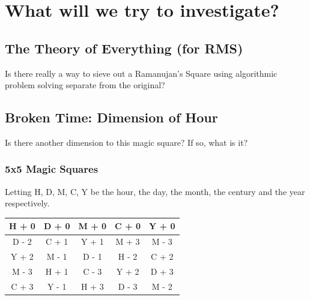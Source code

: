 \documentclass[a4paper,12pt,oneside]{book}
\begin{document}
\chapter{What will we try to investigate?}

\section{The Theory of Everything (for RMS)}
Is there really a way to sieve out a Ramanujan's Square using algorithmic problem solving separate from the original?

\section{Broken Time: Dimension of Hour}
Is there another dimension to this magic square? If so, what is it?
    \subsection{5x5 Magic Squares}
        Letting H, D, M, C, Y be the hour, the day, the month, the century and the year respectively. \\
        \def\arraystretch{2}
        \begin{center}
            \begin{tabular}{c|c|c|c|c}
                \hline
                 H + 0 & D + 0 & M + 0 & C + 0 & Y + 0  \\
                 \hline
                 D - 2 & C + 1 & Y + 1 & M + 3 & M - 3 \\
                 \hline
                 Y + 2 & M - 1 & D - 1 & H - 2 & C + 2 \\
                 \hline
                 M - 3 & H + 1 & C - 3 & Y + 2 & D + 3 \\
                 \hline
                 C + 3 & Y - 1 & H + 3 & D - 3 & M - 2 \\
                 \hline
            \end{tabular}
        \end{center}
\end{document}
